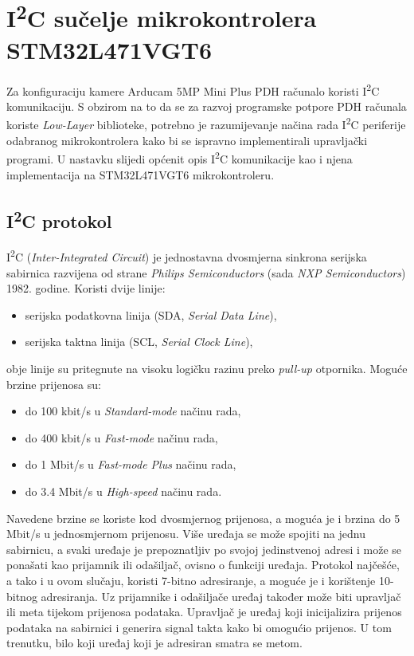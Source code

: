 \chapter{I\textsuperscript{2}C sučelje mikrokontrolera STM32L471VGT6}
Za konfiguraciju kamere Arducam 5MP Mini Plus  PDH računalo koristi
I\textsuperscript{2}C komunikaciju. S obzirom na to da se za razvoj programske
potpore PDH računala koriste \textit{Low-Layer} biblioteke, potrebno je
razumijevanje načina rada I\textsuperscript{2}C periferije odabranog
mikrokontrolera kako bi se ispravno implementirali upravljački programi. U
nastavku slijedi općenit opis I\textsuperscript{2}C komunikacije kao i njena
implementacija na STM32L471VGT6 mikrokontroleru.

\section{I\textsuperscript{2}C protokol}
I\textsuperscript{2}C (\textit{Inter-Integrated Circuit}) je jednostavna
dvosmjerna sinkrona serijska sabirnica razvijena od strane \textit{Philips
Semiconductors} (sada \textit{NXP Semiconductors}) 1982. godine. Koristi dvije
linije:
\begin{itemize}
	\item serijska podatkovna linija (SDA, \textit{Serial Data Line}),
	\item serijska taktna linija (SCL, \textit{Serial Clock Line}),
\end{itemize}
obje linije su pritegnute na visoku logičku razinu preko \textit{pull-up}
otpornika. Moguće brzine prijenosa su:
\begin{itemize}
	\item do 100 \si{kbit/s} u \textit{Standard-mode} načinu rada, 
	\item do 400 \si{kbit/s} u \textit{Fast-mode} načinu rada,
	\item do 1 \si{Mbit/s} u \textit{Fast-mode Plus} načinu rada,
	\item do 3.4 \si{Mbit/s} u \textit{High-speed} načinu rada.
\end{itemize}
Navedene brzine se koriste kod dvosmjernog prijenosa, a moguća je i brzina do 5
\si{Mbit/s} u jednosmjernom prijenosu. Više uređaja se može spojiti na jednu
sabirnicu, a svaki uređaje je prepoznatljiv po svojoj jedinstvenoj adresi i
može se ponašati kao prijamnik ili odašiljač, ovisno o funkciji uređaja.
Protokol najčešće, a tako i u ovom slučaju, koristi 7-bitno adresiranje, a
moguće je i korištenje 10-bitnog adresiranja. Uz prijamnike i odašiljače uređaj
također može biti upravljač ili meta tijekom prijenosa podataka. Upravljač je
uređaj koji inicijalizira prijenos podataka na sabirnici i generira signal
takta kako bi omogućio prijenos. U tom trenutku, bilo koji uređaj koji je
adresiran smatra se metom.

